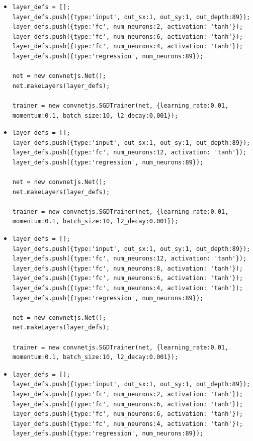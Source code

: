 \begin{itemize}
\item \begin{verbatim}
layer_defs = [];
layer_defs.push({type:'input', out_sx:1, out_sy:1, out_depth:89});
layer_defs.push({type:'fc', num_neurons:2, activation: 'tanh'});
layer_defs.push({type:'fc', num_neurons:6, activation: 'tanh'});
layer_defs.push({type:'fc', num_neurons:4, activation: 'tanh'});
layer_defs.push({type:'regression', num_neurons:89});

net = new convnetjs.Net();
net.makeLayers(layer_defs);

trainer = new convnetjs.SGDTrainer(net, {learning_rate:0.01,
momentum:0.1, batch_size:10, l2_decay:0.001});
\end{verbatim}

\item \begin{verbatim}
layer_defs = [];
layer_defs.push({type:'input', out_sx:1, out_sy:1, out_depth:89});
layer_defs.push({type:'fc', num_neurons:12, activation: 'tanh'});
layer_defs.push({type:'regression', num_neurons:89});

net = new convnetjs.Net();
net.makeLayers(layer_defs);

trainer = new convnetjs.SGDTrainer(net, {learning_rate:0.01,
momentum:0.1, batch_size:10, l2_decay:0.001});
\end{verbatim}

\item \begin{verbatim}
layer_defs = [];
layer_defs.push({type:'input', out_sx:1, out_sy:1, out_depth:89});
layer_defs.push({type:'fc', num_neurons:12, activation: 'tanh'});
layer_defs.push({type:'fc', num_neurons:8, activation: 'tanh'});
layer_defs.push({type:'fc', num_neurons:6, activation: 'tanh'});
layer_defs.push({type:'fc', num_neurons:4, activation: 'tanh'});
layer_defs.push({type:'regression', num_neurons:89});

net = new convnetjs.Net();
net.makeLayers(layer_defs);

trainer = new convnetjs.SGDTrainer(net, {learning_rate:0.01, 
momentum:0.1, batch_size:10, l2_decay:0.001});
\end{verbatim}



\item \begin{verbatim}
layer_defs = [];
layer_defs.push({type:'input', out_sx:1, out_sy:1, out_depth:89});
layer_defs.push({type:'fc', num_neurons:2, activation: 'tanh'});
layer_defs.push({type:'fc', num_neurons:6, activation: 'tanh'});
layer_defs.push({type:'fc', num_neurons:6, activation: 'tanh'});
layer_defs.push({type:'fc', num_neurons:4, activation: 'tanh'});
layer_defs.push({type:'regression', num_neurons:89});


\end{verbatim}
\end{itemize}
